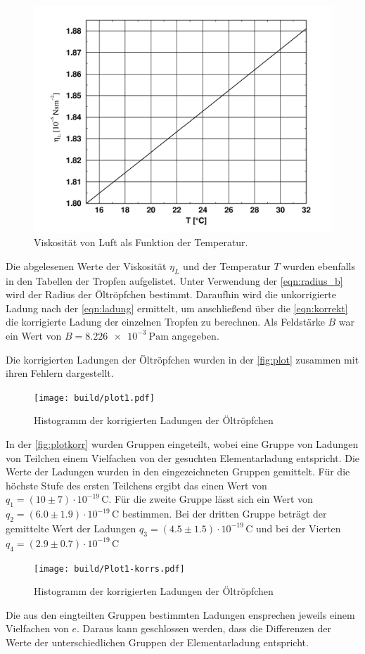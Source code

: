 \begin{figure}[H]
    \centering
	\includegraphics[width=0.75\linewidth]{content/grafik/graph.png}
	\captionsetup{width=0.925\linewidth}
	\caption{Viskosität von Luft als Funktion der Temperatur.\cite{millikan}}
	\label{fig:graph}
\end{figure}

Die abgelesenen Werte der Viskosität $\eta_L$ und der Temperatur $T$ wurden ebenfalls in den Tabellen der Tropfen aufgelistet.
Unter Verwendung der \autoref{eqn:radius_b} wird der Radius der Öltröpfchen bestimmt.
Daraufhin wird die unkorrigierte Ladung nach der \autoref{eqn:ladung} ermittelt, um anschließend 
über die \autoref{eqn:korrekt} die korrigierte Ladung der einzelnen Tropfen zu berechnen. Als Feldstärke $B$ war ein
Wert von $B = \qty{8.226e-3}{\pascal\meter}$ angegeben.

Die korrigierten Ladungen der Öltröpfchen wurden in der \autoref{fig:plot} zusammen mit ihren Fehlern dargestellt.

\begin{figure}[H]
    \centering
    \texttt{[image: build/plot1.pdf]}
    \caption{Histogramm der korrigierten Ladungen der Öltröpfchen}
    \label{fig:plot}
\end{figure}

In der \autoref{fig:plotkorr} wurden Gruppen eingeteilt, wobei eine Gruppe von Ladungen von Teilchen einem Vielfachen von der
gesuchten Elementarladung entspricht. Die Werte der Ladungen wurden in den eingezeichneten Gruppen gemittelt. Für die höchste
Stufe des ersten Teilchens ergibt das einen Wert von $ q_1 = (10 \pm 7) \cdot 10^{-19} \, \mathrm{C}$. Für die zweite Gruppe
lässt sich ein Wert von $q_2 = (6.0 \pm 1.9) \cdot 10^{-19} \, \mathrm{C}$ bestimmen. Bei der dritten Gruppe beträgt der gemittelte 
Wert der Ladungen $q_3 = (4.5 \pm 1.5) \cdot 10^{-19} \, \mathrm{C}$ und bei der Vierten $q_4 = (2.9 \pm 0.7) \cdot 10^{-19} \, \mathrm{C}$

\begin{figure}[H]
    \centering
    \texttt{[image: build/Plot1-korrs.pdf]}
    \caption{Histogramm der korrigierten Ladungen der Öltröpfchen}
    \label{fig:plotkorr}
\end{figure}

Die aus den eingteilten Gruppen bestimmten Ladungen ensprechen jeweils einem Vielfachen von $e$. Daraus kann geschlossen werden,
dass die Differenzen der Werte der unterschiedlichen Gruppen der Elementarladung entspricht. 